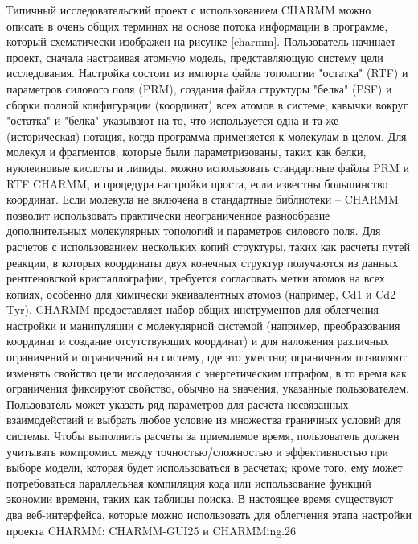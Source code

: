 Типичный исследовательский проект с использованием CHARMM можно описать в очень общих терминах на основе потока информации в программе, который схематически изображен на рисунке \ref{charmm}. Пользователь начинает проект, сначала настраивая атомную модель, представляющую систему цели исследования. Настройка состоит из импорта файла топологии "остатка" (RTF) и параметров силового поля (PRM), создания файла структуры "белка" (PSF) и сборки полной конфигурации (координат) всех атомов в системе; кавычки вокруг "остатка" и "белка" указывают на то, что используется одна и та же (историческая) нотация, когда программа применяется к молекулам в целом. Для молекул и фрагментов, которые были параметризованы, таких как белки, нуклеиновые кислоты и липиды, можно использовать стандартные файлы PRM и RTF CHARMM, и процедура настройки проста, если известны большинство координат. Если молекула не включена в стандартные библиотеки -- CHARMM позволит использовать практически неограниченное разнообразие дополнительных молекулярных топологий и параметров силового поля. Для расчетов с использованием нескольких копий структуры, таких как расчеты путей реакции, в которых координаты двух конечных структур получаются из данных рентгеновской кристаллографии, требуется согласовать метки атомов на всех копиях, особенно для химически эквивалентных атомов (например, Cd1 и Cd2 Tyr). CHARMM предоставляет набор общих инструментов для облегчения настройки и манипуляции с молекулярной системой (например, преобразования координат и создание отсутствующих координат) и для наложения различных ограничений и ограничений на систему, где это уместно; ограничения позволяют изменять свойство цели исследования с энергетическим штрафом, в то время как ограничения фиксируют свойство, обычно на значения, указанные пользователем. Пользователь может указать ряд параметров для расчета несвязанных взаимодействий и выбрать любое условие из множества граничных условий для системы. Чтобы выполнить расчеты за приемлемое время, пользователь должен учитывать компромисс между точностью/сложностью и эффективностью при выборе модели, которая будет использоваться в расчетах; кроме того, ему может потребоваться параллельная компиляция кода или использование функций экономии времени, таких как таблицы поиска. В настоящее время существуют два веб-интерфейса, которые можно использовать для облегчения этапа настройки проекта CHARMM: CHARMM-GUI25 и CHARMMing.26

